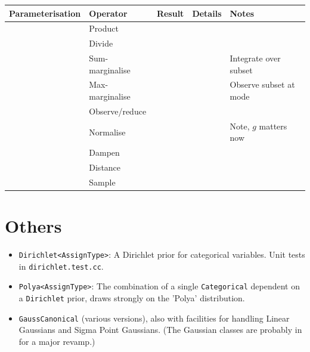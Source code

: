 \documentclass[oneside,english]{scrbook}
\begin{document}
\begin{tabular}{lllll}
  Parameterisation         & Operator             & Result                   & Details & Notes\\ \hline
                           & Product              &                          &         & \parbox{0.4\textwidth}{}\\
                           & Divide               &                          &         & \parbox{0.4\textwidth}{}\\
                           & Sum-marginalise      &                          &         & \parbox{0.4\textwidth}{Integrate over subset}\\
                           & Max-marginalise      &                          &         & \parbox{0.4\textwidth}{Observe subset at mode}\\
                           & Observe/reduce       &                          &         & \parbox{0.4\textwidth}{}\\
                           & Normalise            &                          &         & \parbox{0.4\textwidth}{Note, $g$ matters now}\\
                           & Dampen               &                          &         & \parbox{0.4\textwidth}{}\\
                           & Distance             &                          &         & \parbox{0.4\textwidth}{}\\
                           & Sample               &                          &         & \parbox{0.4\textwidth}{}\\
\end{tabular}



\chapter{Others}

\begin{itemize}
\item \texttt{Dirichlet<AssignType>}: A Dirichlet prior for categorical
  variables. Unit tests in \texttt{dirichlet.test.cc}.
\item \texttt{Polya<AssignType>}: The combination of a single
  \texttt{Categorical} dependent on a \texttt{Dirichlet} prior, draws
  strongly on the 'Polya' distribution.
\item \texttt{GaussCanonical} (various versions), also with facilities
  for handling Linear Gaussians and Sigma Point Gaussians.  (The Gaussian
  classes are probably in for a major revamp.)
\end{itemize}
\end{document}
